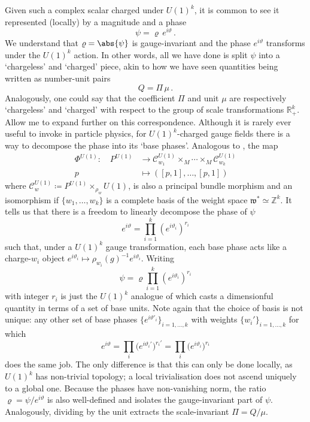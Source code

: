 \documentclass[12pt]{article}
\numberwithin{equation}{section}
\newcommand{\R}{\mathbb{R}}
\newcommand{\Z}{\mathbb{Z}}
\begin{document}
Given such a complex scalar charged under $U(1)^k$, it is common to see it represented (locally) by a magnitude and a phase
\begin{equation}
    \psi = \varrho\, e^{i\vartheta}\,.
\end{equation}
We understand that $\varrho = \abs{\psi}$ is gauge-invariant and the phase $e^{i\vartheta}$ transforms under the $U(1)^k$ action. In other words, all we have done is split $\psi$ into a `chargeless' and `charged' piece, akin to how we have seen quantities being written as number-unit pairs
\begin{equation}
    Q = \Pi\, \mu\,.
\end{equation}
Analogously, one could say that the coefficient $\Pi$ and unit $\mu$ are respectively `chargeless' and `charged' with respect to the group of scale transformations $\R_+^k$. Allow me to expand further on this correspondence. Although it is rarely ever useful to invoke in particle physics, for $U(1)^k$-charged gauge fields there is a way to decompose the phase into its `base phases'. Analogous to , the map
\begin{equation}
    \begin{split}
        \mathsf{\Phi}^{U(1)}\colon\quad P^{U(1)} & \to \mathcal{C}_{w_1}^{U(1)}\times_M\cdots \times_M\mathcal{C}_{w_k}^{U(1)}\\
        p & \mapsto ([p,1],\dots,[p,1]) 
    \end{split}
\end{equation}
where $\mathcal{C}_{w}^{U(1)}\coloneqq P^{U(1)}\times_{\rho_w}U(1)$, is also a principal bundle morphism and an isomorphism if $\{w_1,\dots,w_k\}$ is a complete basis of the weight space $\mathfrak{w}^*\simeq \Z^k$. It tells us that there is a freedom to linearly decompose the phase of $\psi$
\begin{equation}
    e^{i\vartheta} = \prod_{i=1}^k \left(e^{i\vartheta_i}\right)^{r_i}
\end{equation}
such that, under a $U(1)^k$ gauge transformation, each base phase acts like a charge-$w_i$ object $e^{i\vartheta_i}\mapsto \rho_{w_i}(g)^{-1}e^{i\vartheta_i}$. Writing
\begin{equation}
    \psi = \varrho\prod_{i=1}^k \left(e^{i\vartheta_i}\right)^{r_i}
\end{equation}
with integer $r_i$ is just the $U(1)^k$ analogue of  which casts a dimensionful quantity in terms of a set of base units. Note again that the choice of basis is not unique: any other set of base phases $\{e^{i\vartheta'_i}\}_{i=1,\dots,k}$ with weights $\{w_i'\}_{i=1,\dots,k}$ for which
\begin{equation}
    e^{i\vartheta} = \prod_i \big(e^{i\vartheta_i'}\big)^{r_i'} = \prod_i \big(e^{i\vartheta_i}\big)^{r_i}
\end{equation}
does the same job. The only difference is that this can only be done locally, as $U(1)^k$ has non-trivial topology; a local trivialisation does not ascend uniquely to a global one. Because the phases have non-vanishing norm, the ratio $\varrho = \psi / e^{i\vartheta}$ is also well-defined and isolates the gauge-invariant part of $\psi$. Analogously, dividing by the unit extracts the scale-invariant $\Pi = Q/\mu$. 
\end{document}
